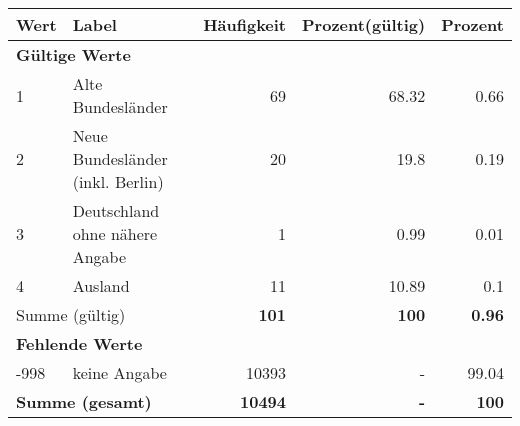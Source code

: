      \begin{longtable}{lXrrr}
     \toprule
     \textbf{Wert} & \textbf{Label} & \textbf{Häufigkeit} & \textbf{Prozent(gültig)} & \textbf{Prozent} \\
     \endhead
     \midrule
     \multicolumn{5}{l}{\textbf{Gültige Werte}}\\

     1 &
     \multicolumn{1}{X}{ Alte Bundesländer   } &


       \num{69} &
       \num[round-mode=places,round-precision=2]{68,32} &
         \num[round-mode=places,round-precision=2]{0,66} \\

     2 &
     \multicolumn{1}{X}{ Neue Bundesländer (inkl. Berlin)   } &


       \num{20} &
       \num[round-mode=places,round-precision=2]{19,8} &
         \num[round-mode=places,round-precision=2]{0,19} \\

     3 &
     \multicolumn{1}{X}{ Deutschland ohne nähere Angabe   } &


       \num{1} &
       \num[round-mode=places,round-precision=2]{0,99} &
         \num[round-mode=places,round-precision=2]{0,01} \\

     4 &
     \multicolumn{1}{X}{ Ausland   } &


       \num{11} &
       \num[round-mode=places,round-precision=2]{10,89} &
         \num[round-mode=places,round-precision=2]{0,1} \\
     \midrule
     \multicolumn{2}{l}{Summe (gültig)} &
       \textbf{\num{101}} &
     \textbf{100} &
       \textbf{\num[round-mode=places,round-precision=2]{0,96}} \\
     \multicolumn{5}{l}{\textbf{Fehlende Werte}}\\
       -998 &
       keine Angabe &
         \num{10393} &
        - &
         \num[round-mode=places,round-precision=2]{99,04} \\
     \midrule
     \multicolumn{2}{l}{\textbf{Summe (gesamt)}} &
          \textbf{\num{10494}} &
        \textbf{-} &
        \textbf{100} \\
     \bottomrule
     \end{longtable}
     
